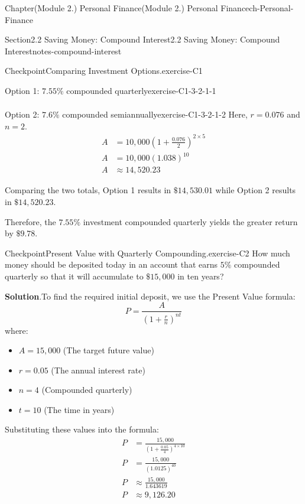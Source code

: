 \documentclass[oneside,10pt,]{book}
\newcommand{\blocktitlefont}{\relax}
\newcommand{\ptxlistdisc}{\raisebox{0.3ex}{\textbullet}}
\newcommand{\amp}{&}
\begin{document}
\begin{chapterptx}{Chapter}{(Module 2.) Personal Finance}{}{(Module 2.) Personal Finance}{}{}{ch-Personal-Finance}
\begin{sectionptx}{Section}{2.2 Saving Money: Compound Interest}{}{2.2 Saving Money: Compound Interest}{}{}{notes-compound-interest}
\begin{inlineexercise}{Checkpoint}{Comparing Investment Options.}{exercise-C1}
\begin{descriptionlist}
\begin{dlimedium}{Option 1: \(7.55\%\) compounded quarterly}{exercise-C1-3-2-1-1}
\begin{align*}
\end{align*}
%
\end{dlimedium}%
\begin{dlimedium}{Option 2: \(7.6\%\) compounded semiannually}{exercise-C1-3-2-1-2}%
Here, \(r = 0.076\) and \(n = 2\).%
\begin{align*}
A \amp = 10,000\left(1 + \frac{0.076}{2}\right)^{2 \times 5}\\
A \amp = 10,000(1.038)^{10}\\
A \amp \approx 14,520.23
\end{align*}
%
\end{dlimedium}%
\end{descriptionlist}
%
\par
Comparing the two totals, Option 1 results in \(\$14,530.01\) while Option 2 results in \(\$14,520.23\).%
\par
Therefore, the \(7.55\%\) investment compounded quarterly yields the greater return by \(\$9.78\).%
\end{inlineexercise}%
\begin{inlineexercise}{Checkpoint}{Present Value with Quarterly Compounding.}{exercise-C2}%
How much money should be deposited today in an account that earns \(5\%\) compounded quarterly so that it will accumulate to \(\$15,000\) in ten years?%
\par\smallskip%
\noindent\textbf{\blocktitlefont Solution}.\hypertarget{exercise-C2-3}{}\quad{}To find the required initial deposit, we use the Present Value formula:%
\begin{equation*}
P = \frac{A}{(1 + \frac{r}{n})^{nt}}
\end{equation*}
where:%
\begin{itemize}[label=\ptxlistdisc]
\item{}\(A = 15,000\) (The target future value)%
\item{}\(r = 0.05\) (The annual interest rate)%
\item{}\(n = 4\) (Compounded quarterly)%
\item{}\(t = 10\) (The time in years)%
\end{itemize}
%
\par
Substituting these values into the formula:%
\begin{align*}
P \amp = \frac{15,000}{(1 + \frac{0.05}{4})^{4 \times 10}}\\
P \amp = \frac{15,000}{(1.0125)^{40}}\\
P \amp \approx \frac{15,000}{1.643619}\\
P \amp \approx 9,126.20

\end{align*}
\end{inlineexercise}
\end{sectionptx}
\end{chapterptx}
\end{document}
